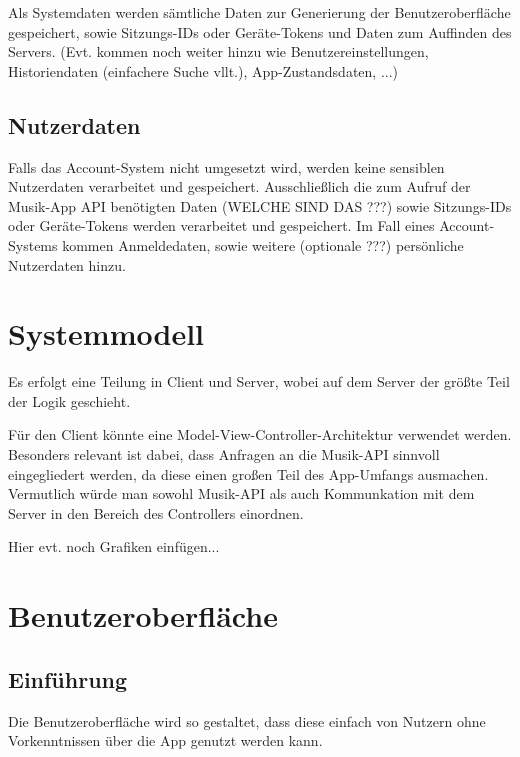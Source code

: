 \documentclass[oneside, ngerman]{sdqtechreport}
\begin{document}
Als Systemdaten werden sämtliche Daten zur Generierung der Benutzeroberfläche gespeichert, sowie Sitzungs-IDs oder Geräte-Tokens und Daten zum Auffinden des Servers. (Evt. kommen noch weiter hinzu wie Benutzereinstellungen, Historiendaten (einfachere Suche vllt.),  App-Zustandsdaten, ...)

\section{Nutzerdaten}
\label{sec:Produktdaten:Nutzerdaten}

Falls das Account-System nicht umgesetzt wird, werden keine sensiblen Nutzerdaten verarbeitet und gespeichert. Ausschließlich die zum Aufruf der Musik-App API benötigten Daten (WELCHE SIND DAS ???) sowie Sitzungs-IDs oder Geräte-Tokens werden verarbeitet und gespeichert.
Im Fall eines Account-Systems kommen Anmeldedaten, sowie weitere (optionale ???) persönliche Nutzerdaten hinzu.



\chapter{Systemmodell}
\label{chap:Systemmodell}

Es erfolgt eine Teilung in Client und Server, wobei auf dem Server der größte Teil der Logik geschieht.

Für den Client könnte eine Model-View-Controller-Architektur verwendet werden. Besonders relevant ist dabei, dass Anfragen an die Musik-API sinnvoll eingegliedert werden, da diese einen großen Teil des App-Umfangs ausmachen. Vermutlich würde man sowohl Musik-API als auch Kommunkation mit dem Server in den Bereich des Controllers einordnen.

Hier evt. noch Grafiken einfügen...



\chapter{Benutzeroberfläche}
\label{chap:Benutzeroberfläche}

\section{Einführung}
\label{sec:Benutzeroberfläche:Einführung}
\textbf{} Die Benutzeroberfläche wird so gestaltet, dass diese einfach von Nutzern ohne Vorkenntnissen über die App genutzt werden kann. 
\end{document}
